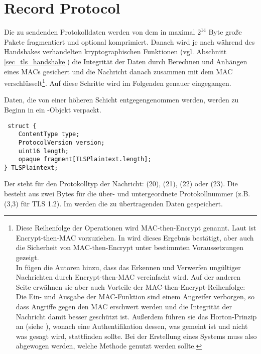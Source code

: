 \section{Record Protocol}
Die zu sendenden Protokolldaten werden von dem \recordprotocol{} in maximal \(2^{14}\) Byte große Pakete fragmentiert und optional komprimiert. Danach wird je nach während des Handshakes verhandelten kryptographischen Funktionen (vgl. Abschnitt \ref{sec_tls_handshake}) die Integrität der Daten durch Berechnen und Anhängen eines MACs gesichert und die Nachricht danach zusammen mit dem MAC verschlüsselt\footnote{
	Diese Reihenfolge der Operationen wird MAC-then-Encrypt genannt.
	Laut \cite{AE2000} ist Encrypt-then-MAC vorzuziehen.
	In \cite{krawczyk01} wird dieses Ergebnis bestätigt, aber auch die Sicherheit von MAC-then-Encrypt unter bestimmten Voraussetzungen gezeigt.\\
	In \cite{ferguson10} fügen die Autoren hinzu, dass das Erkennen und Verwerfen ungültiger Nachrichten durch Encrypt-then-MAC vereinfacht wird. Auf der anderen Seite erwähnen sie aber auch Vorteile der MAC-then-Encrypt-Reihenfolge: Die Ein- und Ausgabe der MAC-Funktion sind einem Angreifer verborgen, so dass Angriffe gegen den MAC erschwert werden und die Integrität der Nachricht damit besser geschützt ist. Außerdem führen sie das Horton-Prinzip an (siehe \cite{wagner96}), wonach eine Authentifikation dessen, was gemeint ist und nicht was gesagt wird, stattfinden sollte. Bei der Erstellung eines Systems muss also abgewogen werden, welche Methode genutzt werden sollte.
}. Auf diese Schritte wird im Folgenden genauer eingegangen.

Daten, die von einer höheren Schicht entgegengenommen werden, werden zu Beginn in ein -Objekt verpackt. 

\begin{lstlisting}
 struct {
	ContentType type;  
	ProtocolVersion version; 
	uint16 length;
	opaque fragment[TLSPlaintext.length];
} TLSPlaintext;
\end{lstlisting}

%

Der  steht für den Protokolltyp der Nachricht: \changecipherspecprotocol{} (20), \alertprotocol{} (21), \handshakeprotocol{} (22) oder \applicationdataprotocol{} (23). Die  besteht aus zwei Bytes für die über- und untergeordnete Protokollnummer (z.B. (3,3) für TLS 1.2). Im  werden die zu übertragenden Daten gespeichert.

